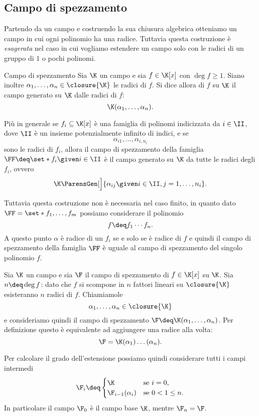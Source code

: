 \subsection{Campo di spezzamento}

Partendo da un campo e costruendo la sua chiusura algebrica otteniamo un campo in cui ogni polinomio ha una radice. Tuttavia questa costruzione è \emph{esagerata} nel caso in cui vogliamo estendere un campo solo con le radici di un gruppo di $1$ o pochi polinomi.

\begin{definition}
    {Campo di spezzamento}{}
    Sia $\K$ un campo e sia $f \in \K[x]$ con $\deg f \geq 1$. Siano inoltre $\alpha_1, \dots, \alpha_n \in \closure{\K}$ le radici di $f$. Si dice allora  di $f$ su $\K$ il campo generato su $\K$ dalle radici di $f$: \[
        \K(\alpha_1, \dots, \alpha_n).
    \]   
\end{definition}

Più in generale se $f_i \subseteq \K[x]$ è una famiglia di polinomi indicizzata da $i \in \II$, dove $\II$ è un insieme potenzialmente infinito di indici, e se \[
    \alpha_{i1}, \dots, \alpha_{i,n_i}
\] sono le radici di $f_i$, allora il campo di spezzamento della famiglia $\FF \deq \set*{f_i \given i \in \II}$ è il campo generato su $\K$ da tutte le radici degli $f_i$, ovvero \[
    \K\ParensGen[\Big]{\alpha_{ij} \given i \in \II, j = 1, \dots, n_i}.
\] 

Tuttavia questa costruzione non è necessaria nel caso finito, in quanto dato $\FF = \set*{f_1, \dots, f_m}$ possiamo considerare il polinomio \[
    f \deq f_1 \cdots f_n.
\] A questo punto $\alpha$ è radice di un $f_i$ se e solo se è radice di $f$ e quindi il campo di spezzamento della famiglia $\FF$ è uguale al campo di spezzamento del singolo polinomio $f$.


Sia $\K$ un campo e sia $\F$ il campo di spezzamento di $f \in \K[x]$ su $\K$. Sia $n \deq \deg f$: dato che $f$ si scompone in $n$ fattori lineari su $\closure{\K}$ esisteranno $n$ radici di $f$. Chiamiamole \[
    \alpha_1, \dots, \alpha_n \in \closure{\K}
\] e consideriamo quindi il campo di spezzamento $\F \deq \K(\alpha_1, \dots, \alpha_n)$.
Per definizione questo è equivalente ad aggiungere una radice alla volta: \[
    \F = \K(\alpha_1)\dots(\alpha_n).
\] 

Per calcolare il grado dell'estensione possiamo quindi considerare tutti i campi intermedi \[
    \F_i \deq \begin{cases}
        \K &\text{se } i = 0, \\
        \F_{i-1}(\alpha_i) &\text{se } 0 < 1 \leq n. 
    \end{cases}
\] In particolare il campo $\F_0$ è il campo base $\K$, mentre $\F_n = \F$.

